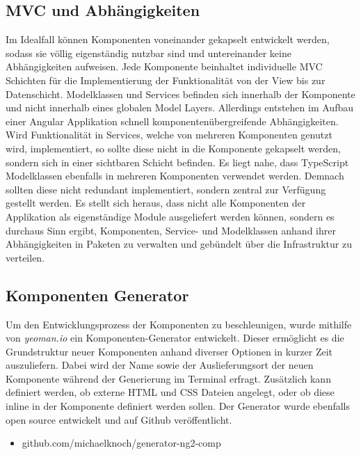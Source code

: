 \subsection{MVC und Abhängigkeiten}

Im Idealfall können Komponenten voneinander gekapselt entwickelt werden,
sodass sie völlig eigenständig nutzbar sind und untereinander keine Abhängigkeiten aufweisen.
Jede Komponente beinhaltet individuelle \ac{MVC} Schichten für die Implementierung der Funktionalität von der View bis zur Datenschicht.
Modelklassen und Services befinden sich innerhalb der Komponente und nicht innerhalb eines globalen Model Layers.
Allerdings entstehen im Aufbau einer Angular Applikation schnell komponentenübergreifende Abhängigkeiten.
Wird Funktionalität in Services, welche von mehreren Komponenten genutzt wird, implementiert,
so sollte diese nicht in die Komponente gekapselt werden, sondern sich in einer sichtbaren Schicht befinden.
Es liegt nahe, dass TypeScript Modelklassen ebenfalls in mehreren Komponenten verwendet werden.
Demnach sollten diese nicht redundant implementiert,
sondern zentral zur Verfügung gestellt werden. Es stellt sich heraus,
dass nicht alle Komponenten der Applikation \projectname{} als eigenständige Module ausgeliefert werden können,
sondern es durchaus Sinn ergibt, Komponenten, Service- und Modelklassen anhand ihrer Abhängigkeiten in Paketen zu verwalten und
gebündelt über die Infrastruktur zu verteilen.


\subsection{Komponenten Generator}

Um den Entwicklungsprozess der Komponenten zu beschleunigen, wurde mithilfe von \emph{yeoman.io} ein Komponenten-Generator entwickelt.
Dieser ermöglicht es die Grundstruktur neuer Komponenten anhand diverser Optionen in kurzer Zeit auszuliefern.
Dabei wird der Name sowie der Auslieferungsort der neuen Komponente während der Generierung im Terminal erfragt.
Zusätzlich kann definiert werden, ob externe \ac{HTML} und \ac{CSS} Dateien angelegt, oder ob diese inline in der Komponente definiert werden sollen.
Der Generator wurde ebenfalls open source entwickelt und auf Github veröffentlicht.

\begin{itemize}
\item github.com/michaelknoch/generator-ng2-comp
\end{itemize}


